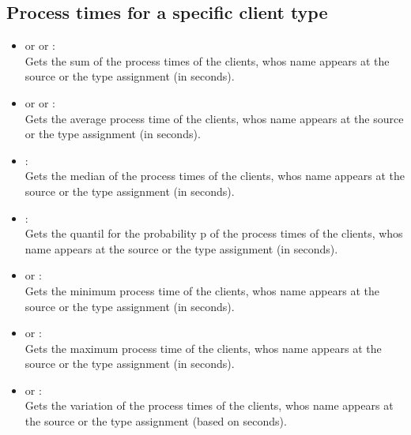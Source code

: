 \subsection{Process times for a specific client type}

\begin{itemize}

\item
{} or  or :\\
Gets the sum of the process times of the clients, whos name appears at the source or the type assignment  (in seconds).

\item
{} or  or :\\
Gets the average process time of the clients, whos name appears at the source or the type assignment  (in seconds).

\item
{}:\\
Gets the median of the process times of the clients, whos name appears at the source or the type assignment  (in seconds).

\item
{}:\\
Gets the quantil for the probability p of the process times of the clients, whos name appears at the source or the type assignment  (in seconds).

\item
{} or :\\
Gets the minimum process time of the clients, whos name appears at the source or the type assignment  (in seconds).

\item
{} or :\\
Gets the maximum process time of the clients, whos name appears at the source or the type assignment  (in seconds).

\item
{} or :\\
Gets the variation of the process times of the clients, whos name appears at the source or the type assignment  (based on seconds).


\end{itemize}
